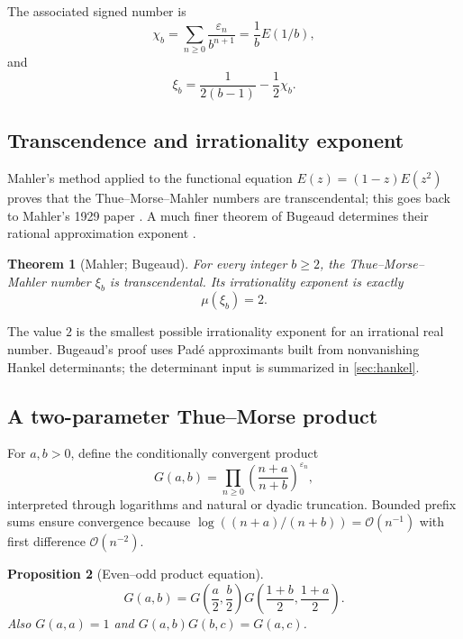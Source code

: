 \documentclass[11pt,oneside]{article}
\newtheorem{theorem}{Theorem}[section]
\newtheorem{proposition}[theorem]{Proposition}
\theoremstyle{definition}
\theoremstyle{remark}
\newcommand{\bigO}{\mathcal O}
\newcommand{\eps}{\varepsilon}
\begin{document}
The associated signed number is
\begin{equation}\label{eq:signed-mahler-number}
 \chi_b=\sum_{n\ge0}\frac{\eps_n}{b^{n+1}}
 =\frac1bE(1/b),
\end{equation}
and
\begin{equation}\label{eq:xi-chi}
 \xi_b=\frac1{2(b-1)}-\frac12\chi_b.
\end{equation}

\subsection{Transcendence and irrationality exponent}

Mahler's method applied to the functional equation
$E(z)=(1-z)E(z^2)$ proves that the Thue--Morse--Mahler numbers are
transcendental; this goes back to Mahler's 1929 paper
\cite{mahler1929}.  A much finer theorem of Bugeaud determines their rational
approximation exponent \cite{bugeaud2011}.

\begin{theorem}[Mahler; Bugeaud]\label{thm:mahler-bugeaud}
For every integer $b\ge2$, the Thue--Morse--Mahler number $\xi_b$ is
transcendental.  Its irrationality exponent is exactly
\begin{equation}\label{eq:irrationality-exponent-two}
 \mu(\xi_b)=2.
\end{equation}
\end{theorem}

The value $2$ is the smallest possible irrationality exponent for an
irrational real number.  Bugeaud's proof uses Pad\'e approximants built from
nonvanishing Hankel determinants; the determinant input is summarized in
\cref{sec:hankel}.

\subsection{A two-parameter Thue--Morse product}

For $a,b>0$, define the conditionally convergent product
\begin{equation}\label{eq:G-ab}
 G(a,b)=\prod_{n\ge0}
 \left(\frac{n+a}{n+b}\right)^{\eps_n},
\end{equation}
interpreted through logarithms and natural or dyadic truncation.  Bounded
prefix sums ensure convergence because
$\log((n+a)/(n+b))=\bigO(n^{-1})$ with first difference
$\bigO(n^{-2})$.

\begin{proposition}[Even--odd product equation]\label{prop:G-functional}
\begin{equation}\label{eq:G-functional}
 \boxed{\qquad
 G(a,b)=G\!\left(\frac a2,\frac b2\right)
 G\!\left(\frac{1+b}{2},\frac{1+a}{2}\right).
 \qquad}
\end{equation}
Also $G(a,a)=1$ and $G(a,b)G(b,c)=G(a,c)$.
\end{proposition}
\end{document}
